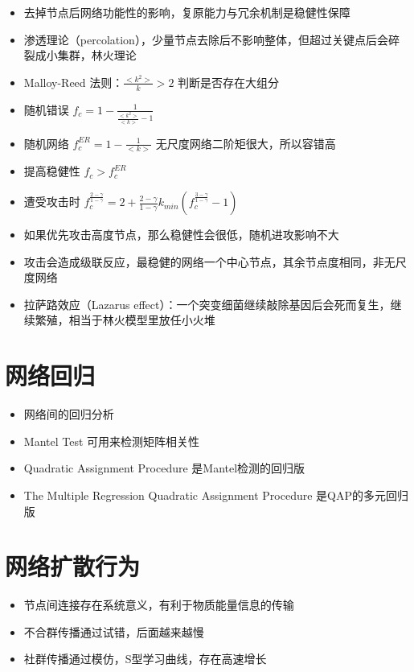 \documentclass[
]{book}
\providecommand{\tightlist}{%
  \setlength{\itemsep}{0pt}\setlength{\parskip}{0pt}}
\begin{document}
\begin{itemize}
\tightlist
\item
  去掉节点后网络功能性的影响，复原能力与冗余机制是稳健性保障
\item
  渗透理论（percolation），少量节点去除后不影响整体，但超过关键点后会碎裂成小集群，林火理论
\item
  Malloy-Reed 法则：\(\frac{<k^2>}{k}>2\) 判断是否存在大组分
\item
  随机错误 \(f_c = 1-\frac{1}{\frac{<k^2>}{<k>}-1}\)
\item
  随机网络 \(f_c^{ER}=1-\frac{1}{<k>}\) 无尺度网络二阶矩很大，所以容错高
\item
  提高稳健性 \(f_c>f_c^{ER}\)
\item
  遭受攻击时 \(f_c^{\frac{2-\gamma}{1-\gamma}}=2+\frac{2-\gamma}{1-\gamma}k_{min}(f_c^{\frac{3-\gamma}{1-\gamma}}-1)\)
\item
  如果优先攻击高度节点，那么稳健性会很低，随机进攻影响不大
\item
  攻击会造成级联反应，最稳健的网络一个中心节点，其余节点度相同，非无尺度网络
\item
  拉萨路效应（Lazarus effect）：一个突变细菌继续敲除基因后会死而复生，继续繁殖，相当于林火模型里放任小火堆
\end{itemize}

\hypertarget{ux7f51ux7edcux56deux5f52}{%
\section{网络回归}\label{ux7f51ux7edcux56deux5f52}}

\begin{itemize}
\tightlist
\item
  网络间的回归分析
\item
  Mantel Test 可用来检测矩阵相关性
\item
  Quadratic Assignment Procedure 是Mantel检测的回归版
\item
  The Multiple Regression Quadratic Assignment Procedure 是QAP的多元回归版
\end{itemize}

\hypertarget{ux7f51ux7edcux6269ux6563ux884cux4e3a}{%
\section{网络扩散行为}\label{ux7f51ux7edcux6269ux6563ux884cux4e3a}}

\begin{itemize}
\tightlist
\item
  节点间连接存在系统意义，有利于物质能量信息的传输
\item
  不合群传播通过试错，后面越来越慢
\item
  社群传播通过模仿，S型学习曲线，存在高速增长
\end{itemize}
\end{document}
